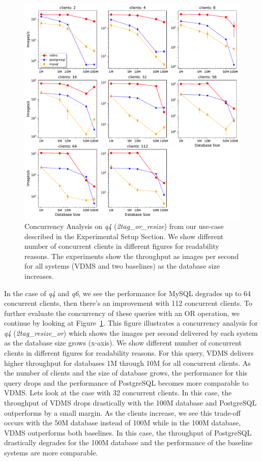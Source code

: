 \begin{figure}[ht]
\includegraphics[width=\columnwidth]{figures/plot_q_2tag_resize_or_mosaic_results_throughput_threads}
\caption{Concurrency Analysis on \textit{q4} (\textit{2tag\_or\_resize}) from our use-case
described in the Experimental Setup Section.
We show different number of concurrent clients in different figures for readability reasons.
The experiments show the throughput as images per second for
all systems (VDMS and two baselines) as the database size increases.}
\label{fig:concurrency_comparison_q4}
\end{figure}

In the case of \textit{q4} and \textit{q6}, we see the performance for MySQL
degrades up to 64 concurrent clients, then there's an improvement with 112 concurrent clients.
To further evaluate the concurrency of these queries with an OR operation, we continue by
looking at Figure~\ref{fig:concurrency_comparison_q4}. This figure illustrates a concurrency analysis for
\textit{q4} (\textit{2tag\_resize\_or}) which shows the images per second
delivered by each system as the database size grows (x-axis). We show different number
of concurrent clients in different figures for readability reasons.  For this query,
VDMS delivers higher throughput for databases 1M through 10M for all concurrent clients.
As the number of clients and the size of database grows, the performance for this query
drops and the performance of PostgreSQL becomes more comparable to VDMS. Lets look at the
case with 32 concurrent clients.
In this case, the throughput of VDMS drops drastically with
the 100M database and PostgreSQL outperforms by a small margin.
As the clients increase, we see this trade-off occurs with the 50M database
instead of 100M while in the 100M database, VDMS outperforms both baselines.
In this case, the throughput of PostgreSQL drastically degrades
for the 100M database and the performance of the baseline systems are more comparable.


